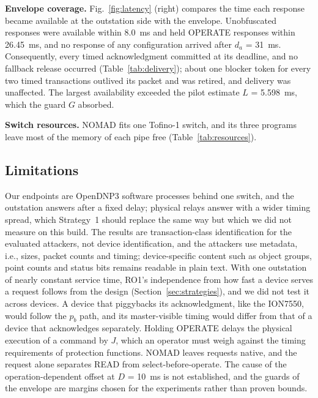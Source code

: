 \textbf{Envelope coverage.} Fig.~\ref{fig:latency} (right) compares the time each response became available at the outstation side with the envelope. Unobfuscated responses were available within 8.0~ms and held OPERATE responses within 26.45~ms, and no response of any configuration arrived after $d_a$ = 31~ms. Consequently, every timed acknowledgment committed at its deadline, and no fallback release occurred (Table~\ref{tab:delivery}); about one blocker token for every two timed transactions outlived its packet and was retired, and delivery was unaffected. The largest availability exceeded the pilot estimate $L$ = 5.598~ms, which the guard $G$ absorbed. %

\textbf{Switch resources.} NOMAD fits one Tofino-1 switch, and its three programs leave most of the memory of each pipe free (Table~\ref{tab:resources}). %

\subsection{Limitations}

Our endpoints are OpenDNP3 software processes behind one switch, and the outstation answers after a fixed delay; physical relays answer with a wider timing spread, which Strategy~1 should replace the same way but which we did not measure on this build. The results are transaction-class identification for the evaluated attackers, not device identification, and the attackers use metadata, i.e., sizes, packet counts and timing; device-specific content such as object groups, point counts and status bits remains readable in plain text. With one outstation of nearly constant service time, RO1's independence from how fast a device serves a request follows from the design (Section~\ref{sec:strategies}), and we did not test it across devices. A device that piggybacks its acknowledgment, like the ION7550, would follow the $p_b$ path, and its master-visible timing would differ from that of a device that acknowledges separately. Holding OPERATE delays the physical execution of a command by $J$, which an operator must weigh against the timing requirements of protection functions. NOMAD leaves requests native, and the request alone separates READ from select-before-operate. The cause of the operation-dependent offset at $D$ = 10~ms is not established, and the guards of the envelope are margins chosen for the experiments rather than proven bounds.
